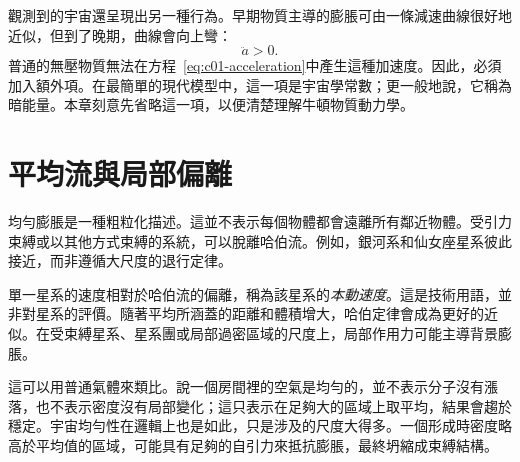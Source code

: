 觀測到的宇宙還呈現出另一種行為。早期物質主導的膨脹可由一條減速曲線很好地近似，但到了晚期，曲線會向上彎：
\begin{equation}
\ddot a>0.
\end{equation}
普通的無壓物質無法在方程~\eqref{eq:c01-acceleration}中產生這種加速度。因此，必須加入額外項。在最簡單的現代模型中，這一項是宇宙學常數；更一般地說，它稱為暗能量。本章刻意先省略這一項，以便清楚理解牛頓物質動力學。

\begin{classroomqa}
\end{classroomqa}

\section{平均流與局部偏離}

均勻膨脹是一種粗粒化描述。這並不表示每個物體都會遠離所有鄰近物體。受引力束縛或以其他方式束縛的系統，可以脫離哈伯流。例如，銀河系和仙女座星系彼此接近，而非遵循大尺度的退行定律。

單一星系的速度相對於哈伯流的偏離，稱為該星系的\emph{本動速度}。這是技術用語，並非對星系的評價。隨著平均所涵蓋的距離和體積增大，哈伯定律會成為更好的近似。在受束縛星系、星系團或局部過密區域的尺度上，局部作用力可能主導背景膨脹。

\begin{classroomqa}
\end{classroomqa}

這可以用普通氣體來類比。說一個房間裡的空氣是均勻的，並不表示分子沒有漲落，也不表示密度沒有局部變化；這只表示在足夠大的區域上取平均，結果會趨於穩定。宇宙均勻性在邏輯上也是如此，只是涉及的尺度大得多。一個形成時密度略高於平均值的區域，可能具有足夠的自引力來抵抗膨脹，最終坍縮成束縛結構。

\begin{classroomqa}
\end{classroomqa}

